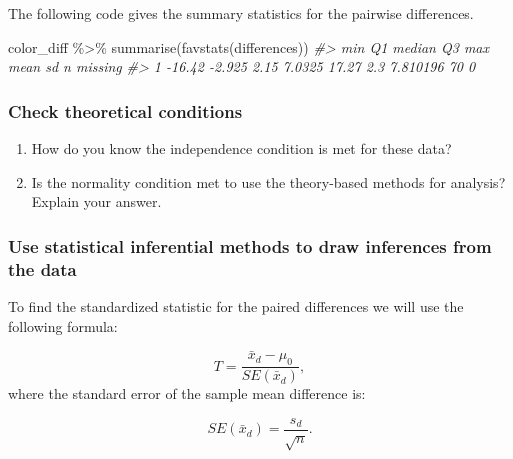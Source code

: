\documentclass[
]{report}
\newenvironment{Shaded}{\begin{snugshade}}{\end{snugshade}}
\newcommand{\CommentTok}[1]{\textcolor[rgb]{0.56,0.35,0.01}{\textit{#1}}}
\newcommand{\FunctionTok}[1]{\textcolor[rgb]{0.00,0.00,0.00}{#1}}
\newcommand{\NormalTok}[1]{#1}
\newcommand{\SpecialCharTok}[1]{\textcolor[rgb]{0.00,0.00,0.00}{#1}}
\begin{document}
The following code gives the summary statistics for the pairwise differences.

\begin{Shaded}
\begin{Highlighting}[]
\NormalTok{color\_diff }\SpecialCharTok{\%\textgreater{}\%} 
  \FunctionTok{summarise}\NormalTok{(}\FunctionTok{favstats}\NormalTok{(differences))}
\CommentTok{\#\textgreater{}      min     Q1 median     Q3   max mean       sd  n missing}
\CommentTok{\#\textgreater{} 1 {-}16.42 {-}2.925   2.15 7.0325 17.27  2.3 7.810196 70       0}
\end{Highlighting}
\end{Shaded}

\hypertarget{check-theoretical-conditions}{%
\subsubsection*{Check theoretical conditions}\label{check-theoretical-conditions}}

\begin{enumerate}
\def\labelenumi{\arabic{enumi}.}
\setcounter{enumi}{3}
\item
  How do you know the independence condition is met for these data?
  \vspace{0.8in}
\item
  Is the normality condition met to use the theory-based methods for analysis? Explain your answer.
  \vspace{1in}
\end{enumerate}

\hypertarget{use-statistical-inferential-methods-to-draw-inferences-from-the-data}{%
\subsubsection*{Use statistical inferential methods to draw inferences from the data}\label{use-statistical-inferential-methods-to-draw-inferences-from-the-data}}

To find the standardized statistic for the paired differences we will use the following formula:

\[T = \frac{\bar{x}_d - \mu_0}{SE(\bar{x}_d)},\]
where the standard error of the sample mean difference is:

\[SE(\bar{x}_d)=\frac{s_d}{\sqrt{n}}.\]
\end{document}
